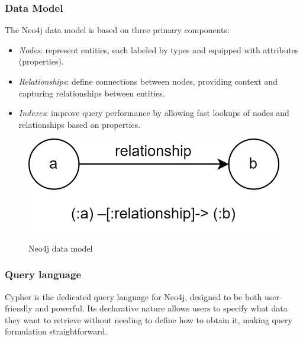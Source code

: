 \subsubsection{Data Model}
The Neo4j data model is based on three primary components:
\begin{itemize}
    \item \textit{Nodes}: represent entities, each labeled by types and equipped with attributes (properties).
    \item \textit{Relationships}: define connections between nodes, providing context and capturing relationships between entities.
    \item \textit{Indexes}: improve query performance by allowing fast lookups of nodes and relationships based on properties.
\end{itemize}
\begin{figure}[H]
    \centering
    \includegraphics[width=0.50\linewidth]{images/neo4j1.png}
    \caption{Neo4j data model}
\end{figure}

\subsubsection{Query language}
Cypher is the dedicated query language for Neo4j, designed to be both user-friendly and powerful. 
Its declarative nature allows users to specify what data they want to retrieve without needing to define how to obtain it, making query formulation straightforward.

